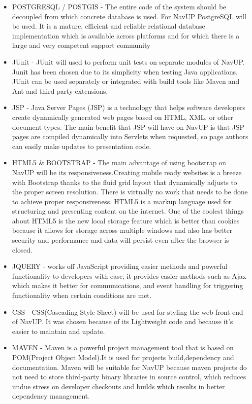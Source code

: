 \begin{itemize}
	\item POSTGRESQL / POSTGIS - The entire code of the system should be decoupled from which concrete database is used. For NavUP PostgreSQL will be used. It is a mature, efficient and reliable relational database implementation which is available across platforms and for which there is a large and very competent support community
	
	\item JUnit - JUnit will used to perform unit tests on separate modules of NavUP. Junit has been chosen due to its simplicity when testing Java applications. JUnit can be used separately or integrated with build tools like Maven and Ant and third party extensions.
	
	\item JSP - Java Server Pages (JSP) is a technology that helps software developers create dynamically generated web pages based on HTML, XML, or other document types. The main benefit that JSP will have on NavUP is that JSP pages are compiled dynamically into Servlets when requested, so page authors can easily make updates to presentation code.
	
	\item HTML5 \& BOOTSTRAP - The main advantage of using bootstrap on NavUP will be its responsiveness.Creating mobile ready websites is a breeze with Bootstrap thanks to the fluid grid layout that dynamically adjusts to the proper screen resolution. There is virtually no work that needs to be done to achieve proper responsiveness. HTML5 is a markup language used for structuring and presenting content on the internet. One of the coolest things about HTML5 is the new local storage feature which is better than cookies because it allows for storage across multiple windows and also has better security and performance and data will persist even after the browser is closed.
	
	\item JQUERY - works off JavaScript providing easier methods and powerful functionality to developers with ease, it provides easier methods such as Ajax which makes it better for communications, and event handling for triggering functionality when certain conditions are met.  
	
	\item CSS - CSS(Cascading Style Sheet) will be used for styling the web front end of NavUP. It was chosen because of its Lightweight code and because it's easier to maintain and update. 
	
	\item MAVEN - Maven is a powerful project management tool that is based on POM(Project Object Model).It is used for projects build,dependency and documentation. Maven will be suitable for NavUP because maven projects do not need to store third-party binary libraries in source control, which reduces undue stress on developer checkouts and builds which results in better dependency management.
	

\end{itemize}
